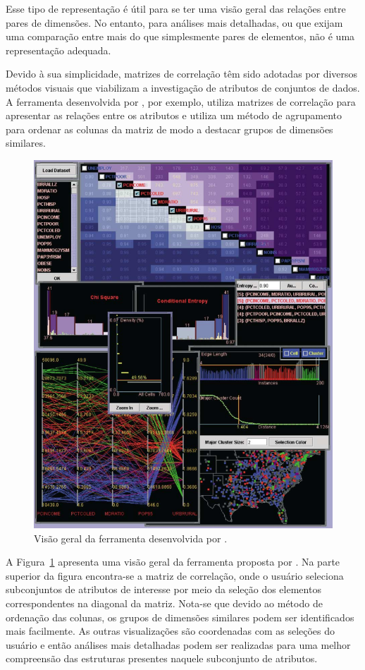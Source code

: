 Esse tipo de representação é útil para se ter uma visão
geral das relações entre pares de dimensões. No entanto,
para análises mais detalhadas, ou que exijam uma comparação
entre mais do que simplesmente pares de elementos, não é uma
representação adequada.

Devido à sua simplicidade, matrizes de correlação têm sido
adotadas por diversos métodos visuais que viabilizam a
investigação de atributos de conjuntos de dados. A
ferramenta desenvolvida por \citet{Guo2003}, por exemplo,
utiliza matrizes de correlação para apresentar as relações
entre os atributos e utiliza um método de agrupamento para
ordenar as colunas da matriz de modo a destacar grupos de
dimensões similares.

\begin{figure}[h!]
    \centering
    \includegraphics[width=12cm]{images/coord.png}
    \caption[Ferramenta proposta por \cite{Guo2003}]
    {Visão geral da ferramenta desenvolvida por
    \citet{Guo2003}.} 
    \label{fig:coord}
\end{figure}

A Figura~\ref{fig:coord} apresenta uma visão geral da
ferramenta proposta por \citet{Guo2003}. Na parte superior
da figura encontra-se a matriz de correlação, onde o usuário
seleciona subconjuntos de atributos de interesse por meio da
seleção dos elementos correspondentes na diagonal da matriz.
Nota-se que devido ao método de ordenação das colunas,
os grupos de dimensões similares podem ser identificados
mais facilmente. As outras visualizações são coordenadas com
as seleções do usuário e então análises mais detalhadas podem
ser realizadas para uma melhor compreensão das estruturas
presentes naquele subconjunto de atributos. 

